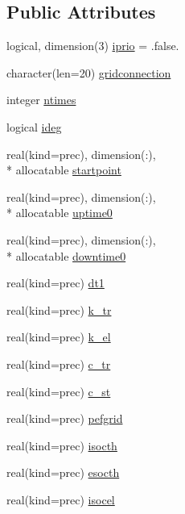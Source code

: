 \subsection*{Public Attributes}
\begin{DoxyCompactItemize}
\item 
logical, dimension(3) \hyperlink{classinputvar_a4bacf572842e302cf317a3cc5e95a9b9}{iprio} = .false.
\item 
character(len=20) \hyperlink{classinputvar_a8488f705094b7c59cf8cb06939fe9a7a}{gridconnection}
\item 
integer \hyperlink{classinputvar_a98d384e0347fb055110c18572dbdb522}{ntimes}
\item 
logical \hyperlink{classinputvar_a62235e6c8b16a98c1aea10ac01e11ac9}{ideg}
\item 
real(kind=prec), dimension(\-:), \\*
allocatable \hyperlink{classinputvar_a3b9acf8a358a0bad89d622cbbbab638f}{startpoint}
\item 
real(kind=prec), dimension(\-:), \\*
allocatable \hyperlink{classinputvar_a3938be0ea72158eee837e2a8c08f29e0}{uptime0}
\item 
real(kind=prec), dimension(\-:), \\*
allocatable \hyperlink{classinputvar_aaab84ab253f188eacce25a200a4ab300}{downtime0}
\item 
real(kind=prec) \hyperlink{classinputvar_a62c9f9492040ef5e03091380533f2c0f}{dt1}
\item 
real(kind=prec) \hyperlink{classinputvar_ad02af5c5e2d12134398545c12e832b9b}{k\-\_\-tr}
\item 
real(kind=prec) \hyperlink{classinputvar_a021273f9a287d8d4c9fcd0651bf17d8e}{k\-\_\-el}
\item 
real(kind=prec) \hyperlink{classinputvar_a52f3b90c5f4c7bb282ebc24e762032a2}{c\-\_\-tr}
\item 
real(kind=prec) \hyperlink{classinputvar_afe1c70c120d3938f07fa818f015ad52d}{c\-\_\-st}
\item 
real(kind=prec) \hyperlink{classinputvar_aeb238280e9c8d1526ff6c11142a32cda}{pefgrid}
\item 
real(kind=prec) \hyperlink{classinputvar_a5f5ab91e72a9ea0ec51d7f621d01108b}{isocth}
\item 
real(kind=prec) \hyperlink{classinputvar_a144453fc737cf5fa64bf329abb73d1c6}{esocth}
\item 
real(kind=prec) \hyperlink{classinputvar_a398c551573b9e71aaae3ba84991c6b81}{isocel}
\item 

\end{DoxyCompactItemize}
